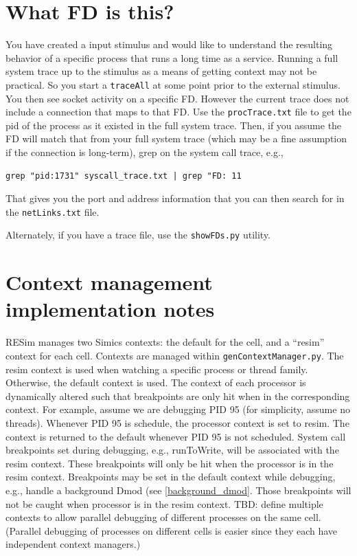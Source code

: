 \documentclass[titlepage]{article}
\begin{document}
\begin{appendices}
\section{What FD is this?}
You have created a input stimulus and would like to understand the resulting behavior of a specific process
that runs a long time as a service.
Running a full system trace up to the stimulus as a means of getting context may not be practical.  So you start
a {\tt traceAll} at some point prior to the external stimulus.  You then see socket activity on a specific FD.
However the current trace does not include a connection that maps to that FD.  Use the {\tt procTrace.txt}
file to get the pid of the process as it existed in the full system trace.  Then, if you assume the FD will match
that from your full system trace (which may be a fine assumption if the connection is long-term), grep on 
the system call trace, e.g.,
\begin{verbatim}
grep "pid:1731" syscall_trace.txt | grep "FD: 11
\end{verbatim}
That gives you the port and address information that you can then search for in the {\tt netLinks.txt} file.

Alternately, if you have a trace file, use the {\tt showFDs.py} utility.

\section{Context management implementation notes}
RESim manages two Simics contexts: the default for the cell, and a ``resim'' context for each cell.
Contexts are managed within {\tt genContextManager.py}. The resim context is used when watching a specific process
or thread family.  Otherwise, the default context is used.  The context of each processor is dynamically altered 
such that breakpoints are only hit when in the corresponding context.  For example, assume we are debugging PID 95
(for simplicity, assume no threads).
Whenever PID 95 is schedule, the processor context is set to resim.  The context is returned to the default whenever
PID 95 is not scheduled.  System call breakpoints set during debugging, e.g., runToWrite, will be associated
with the resim context.  These breakpoints will only be hit when the processor is in the resim context. 
Breakpoints may be set in the default context while debugging, e.g., handle a background Dmod (see \ref{background_dmod}.  Those
breakpoints will not be caught when processor is in the resim context.
TBD: define multiple contexts to allow parallel debugging of different processes on the same cell.  (Parallel 
debugging of processes on different cells is easier since they each have independent context managers.)


\end{appendices}
\end{document}

